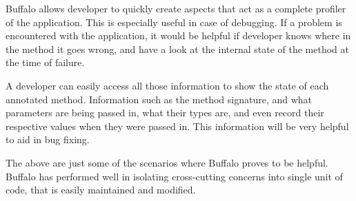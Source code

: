 Buffalo allows developer to quickly create aspects that act as a complete profiler of the application. This is especially useful in case of debugging. If a problem is encountered with the application, it would be helpful if developer knows where in the method it goes wrong, and have a look at the internal state of the method at the time of failure.

A developer can easily access all those information to show the state of each annotated method. Information such as the method signature, and what parameters are being passed in, what their types are, and even record their respective values when they were passed in. This information will be very helpful to aid in bug fixing.

The above are just some of the scenarios where Buffalo proves to be helpful. Buffalo has performed well in isolating cross-cutting concerns into single unit of code, that is easily maintained and modified.

